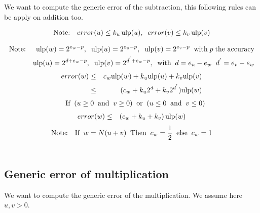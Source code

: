 \documentclass[12pt]{amsart}
\def\ulp{{\rm ulp}}
\begin{document}
We want to compute the generic error of the subtraction, this following rules can be apply on addition too.

\begin{eqnarray}\nonumber
\textnormal{Note:}&& error(u) \leq k_u \, \ulp(u), \;\; error(v) \leq k_v \, \ulp(v)
\end{eqnarray}

\begin{eqnarray}\nonumber
\textnormal{Note:}&& \ulp(w)=2^{e_w-p}, \;\; \ulp(u)=2^{e_u-p},\;\; \ulp(v)=2^{e_v-p}\;\;\textnormal{with} \; p \; \textnormal{the accuracy} \\\nonumber
&& \ulp(u)=2^{d+e_w-p}, \;\; \ulp(v)=2^{d^{'}+e_w-p},\;\;\textnormal{with} \;\;d=e_u-e_w \;\; d^{'}=e_v-e_w 
\end{eqnarray}
\begin{eqnarray}\nonumber
error(w)& \leq &c_w \ulp(w) + k_u \ulp(u) + k_v \ulp(v) \\\nonumber
&\leq&(c_w+k_u 2^d+ k_v 2^{d^{'}}) \ulp(w)
\end{eqnarray}
\begin{eqnarray}\nonumber
&&\textnormal{If} \;\; ( u \geq 0  \;\;\textnormal{and}\;\;  v \geq 0) \;\;\textnormal{or}\;\; (u \leq 0 \;\;\textnormal{and}\;\; v \leq 0)
\end{eqnarray}
\begin{eqnarray}\nonumber
error(w)& \leq&(c_w + k_u + k_v) \, \ulp(w)
\end{eqnarray}
\begin{eqnarray}\nonumber
\textnormal{Note:}&&\textnormal{If}\;\; w=N(u+v) \;\;\textnormal{Then}\;\; c_w =\frac{1}{2} \;\;\textnormal{else}\;\; c_w =1\\\nonumber
\end{eqnarray}

\subsection{Generic error of multiplication}\label{generic:mul}


We want to compute the generic error of the multiplication.
We assume here $u, v > 0$.
\end{document}
